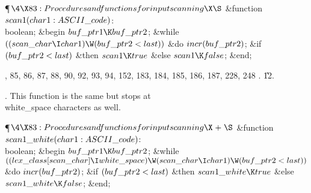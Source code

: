 \Y\P$\4\X83:Procedures and functions for input scanning\X\S$\6
\4\&{function}\1\  $\\{scan1}(\\{char1}:\\{ASCII\_code})$: \\{boolean};\2%
\6
\&{begin} $\\{buf\_ptr1}\K\\{buf\_ptr2}$;\6
\&{while} $((\\{scan\_char}\I\\{char1})\W(\\{buf\_ptr2}<\\{last}))$ \1\&{do}\5
$\\{incr}(\\{buf\_ptr2})$;\2\6
\&{if} $(\\{buf\_ptr2}<\\{last})$ \1\&{then}\5
$\\{scan1}\K\\{true}$\6
\4\&{else} $\\{scan1}\K\\{false}$;\2\6
\&{end};\par
{}, 85, 86, 87, 88, 90, 92, 93, 94, 152, 183, 184, 185, 186, 187, 228, 248%
.
\U12.\fi

.
This function is the same but stops at \\{white\_space} characters as well.

\Y\P$\4\X83:Procedures and functions for input scanning\X\mathrel{+}\S$\6
\4\&{function}\1\  $\\{scan1\_white}(\\{char1}:\\{ASCII\_code})$: %
\\{boolean};\2\6
\&{begin} $\\{buf\_ptr1}\K\\{buf\_ptr2}$;\6
\&{while} $((\\{lex\_class}[\\{scan\_char}]\I\\{white\_space})\W(\\{scan\_char}%
\I\\{char1})\W(\\{buf\_ptr2}<\\{last}))$ \1\&{do}\5
$\\{incr}(\\{buf\_ptr2})$;\2\6
\&{if} $(\\{buf\_ptr2}<\\{last})$ \1\&{then}\5
$\\{scan1\_white}\K\\{true}$\6
\4\&{else} $\\{scan1\_white}\K\\{false}$;\2\6
\&{end};\par
\fi

